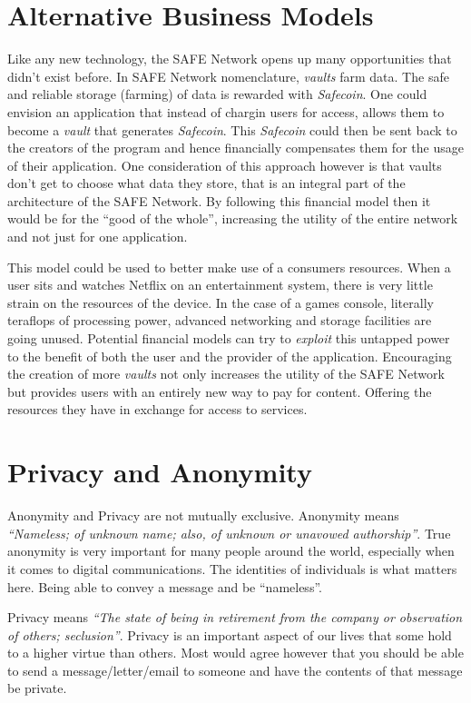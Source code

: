  \section{Alternative Business Models}

Like any new technology, the SAFE Network opens up many opportunities that didn't exist before. In SAFE Network nomenclature, \textit{vaults} farm data. The safe and reliable storage (farming) of data is rewarded with \textit{Safecoin}. One could envision an application that instead of chargin users for access, allows them to become a \textit{vault} that generates \textit{Safecoin}. This \textit{Safecoin} could then be sent back to the creators of the program and hence financially compensates them for the usage of their application. One consideration of this approach however is that vaults don't get to choose what data they store, that is an integral part of the architecture of the SAFE Network. By following this financial model then it would be for the ``good of the whole'', increasing the utility of the entire network and not just for one application.

This model could be used to better make use of a consumers resources. When a user sits and watches Netflix on an entertainment system, there is very little strain on the resources of the device. In the case of a games console, literally teraflops of processing power, advanced networking and storage facilities are going unused. Potential financial models can try to \textit{exploit} this untapped power to the benefit of both the user and the provider of the application. Encouraging the creation of more \textit{vaults} not only increases the utility of the SAFE Network but provides users with an entirely new way to pay for content. Offering the resources they have in exchange for access to services.

\section{Privacy and Anonymity}

Anonymity and Privacy are not mutually exclusive. Anonymity means \textit{``Nameless; of unknown name; also, of unknown or unavowed authorship''}\cite{anonymous}. True anonymity is very important for many people around the world, especially when it comes to digital communications. The identities of individuals is what matters here. Being able to convey a message and be ``nameless''. 

Privacy means \textit{``The state of being in retirement from the company or observation of others; seclusion''}\cite{privacy}. Privacy is an important aspect of our lives that some hold to a higher virtue than others. Most would agree however that you should be able to send a message/letter/email to someone and have the contents of that message be private.

